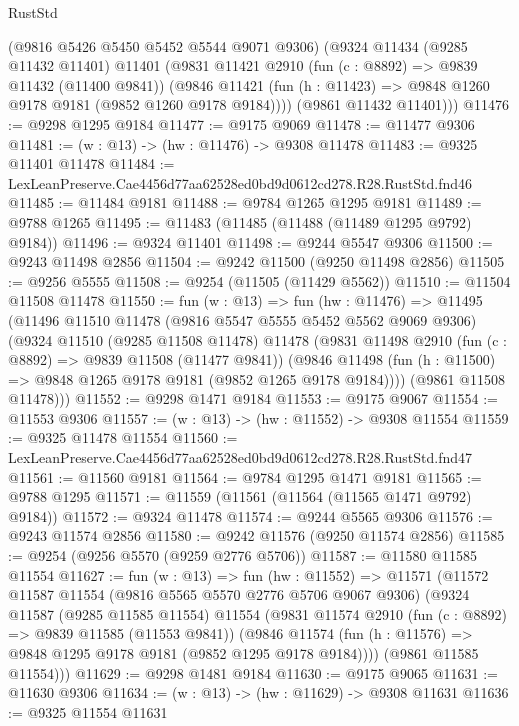 \begin{lexlean}{RustStd}
\begin{coremodule}
      (@9816 @5426 @5450 @5452 @5544 @9071 @9306)
      (@9324
        @11434
        (@9285 @11432 @11401)
        @11401
        (@9831
          @11421
          @2910
          (fun (c : @8892) => @9839 @11432 (@11400 @9841))
          (@9846 @11421 (fun (h : @11423) => @9848 @1260 @9178 @9181 (@9852 @1260 @9178 @9184))))
        (@9861 @11432 @11401)))
@11476 := @9298 @1295 @9184
@11477 := @9175 @9069
@11478 := @11477 @9306
@11481 := (w : @13) -> (hw : @11476) -> @9308 @11478
@11483 := @9325 @11401 @11478
@11484 := LexLeanPreserve.Cae4456d77aa62528ed0bd9d0612cd278.R28.RustStd.fnd46
@11485 := @11484 @9181
@11488 := @9784 @1265 @1295 @9181
@11489 := @9788 @1265
@11495 := @11483 (@11485 (@11488 (@11489 @1295 @9792) @9184))
@11496 := @9324 @11401
@11498 := @9244 @5547 @9306
@11500 := @9243 @11498 @2856
@11504 := @9242 @11500 (@9250 @11498 @2856)
@11505 := @9256 @5555
@11508 := @9254 (@11505 (@11429 @5562))
@11510 := @11504 @11508 @11478
@11550 := fun (w : @13) =>
  fun (hw : @11476) =>
  @11495
    (@11496
      @11510
      @11478
      (@9816 @5547 @5555 @5452 @5562 @9069 @9306)
      (@9324
        @11510
        (@9285 @11508 @11478)
        @11478
        (@9831
          @11498
          @2910
          (fun (c : @8892) => @9839 @11508 (@11477 @9841))
          (@9846 @11498 (fun (h : @11500) => @9848 @1265 @9178 @9181 (@9852 @1265 @9178 @9184))))
        (@9861 @11508 @11478)))
@11552 := @9298 @1471 @9184
@11553 := @9175 @9067
@11554 := @11553 @9306
@11557 := (w : @13) -> (hw : @11552) -> @9308 @11554
@11559 := @9325 @11478 @11554
@11560 := LexLeanPreserve.Cae4456d77aa62528ed0bd9d0612cd278.R28.RustStd.fnd47
@11561 := @11560 @9181
@11564 := @9784 @1295 @1471 @9181
@11565 := @9788 @1295
@11571 := @11559 (@11561 (@11564 (@11565 @1471 @9792) @9184))
@11572 := @9324 @11478
@11574 := @9244 @5565 @9306
@11576 := @9243 @11574 @2856
@11580 := @9242 @11576 (@9250 @11574 @2856)
@11585 := @9254 (@9256 @5570 (@9259 @2776 @5706))
@11587 := @11580 @11585 @11554
@11627 := fun (w : @13) =>
  fun (hw : @11552) =>
  @11571
    (@11572
      @11587
      @11554
      (@9816 @5565 @5570 @2776 @5706 @9067 @9306)
      (@9324
        @11587
        (@9285 @11585 @11554)
        @11554
        (@9831
          @11574
          @2910
          (fun (c : @8892) => @9839 @11585 (@11553 @9841))
          (@9846 @11574 (fun (h : @11576) => @9848 @1295 @9178 @9181 (@9852 @1295 @9178 @9184))))
        (@9861 @11585 @11554)))
@11629 := @9298 @1481 @9184
@11630 := @9175 @9065
@11631 := @11630 @9306
@11634 := (w : @13) -> (hw : @11629) -> @9308 @11631
@11636 := @9325 @11554 @11631

\end{coremodule}
\end{lexlean}
